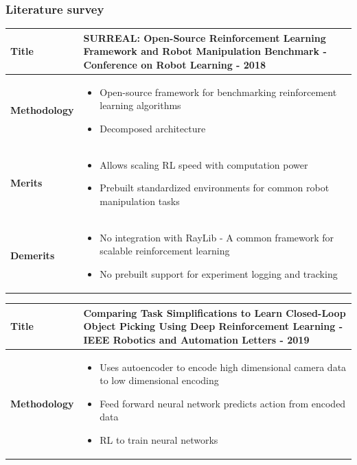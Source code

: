 \documentclass{beamer}
\begin{document}
	\begin{frame}[allowframebreaks]
		\frametitle{Literature survey}
		
		\begin{tabular}{m{2.25cm} | m{9cm}}
			\hline
			
			\textbf{Title} &
			SURREAL: Open-Source Reinforcement Learning Framework and Robot Manipulation Benchmark \cite{corl2018surreal} - Conference on Robot Learning - 2018\\
			\hline
			
			\textbf{Methodology} &
			\begin{itemize}
				\item Open-source framework for benchmarking reinforcement learning algorithms
				\item Decomposed architecture
				
			\end{itemize}\\
			\hline
			
			\textbf{Merits} &
			\begin{itemize}
				\item Allows scaling RL speed with computation power
				\item Prebuilt standardized environments for common robot manipulation tasks
			\end{itemize} \\
			\hline
			
			\textbf{Demerits} &
			\begin{itemize}
				\item No integration with RayLib - A common framework for scalable reinforcement learning
				\item No prebuilt support for experiment logging and tracking
			\end{itemize}\\
			\hline
			
		\end{tabular}
	
		\begin{tabular}{m{2.25cm} | m{9cm}}
			\hline
			
			\textbf{Title} &
			Comparing Task Simplifications to Learn Closed-Loop Object Picking Using Deep Reinforcement Learning \cite{tasksimplification} - IEEE Robotics and Automation Letters - 2019\\
			\hline
			
			\textbf{Methodology} &
			\begin{itemize}
				\item Uses autoencoder to encode high dimensional camera data to low dimensional encoding
				\item Feed forward neural network predicts action from encoded data
				\item RL to train neural networks
			\end{itemize}\\
			\hline
			

\end{tabular}
\end{frame}
\end{document}
